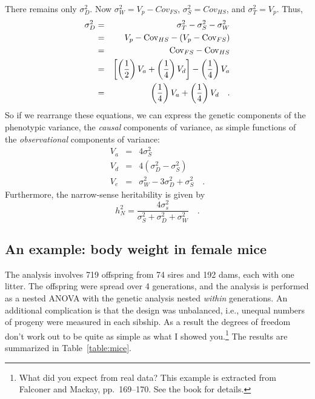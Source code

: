 There remains only $\sigma^2_D$.  Now $\sigma^2_W = V_p - Cov_{FS}$,
$\sigma^2_S = Cov_{HS}$, and $\sigma^2_T = V_p$.  Thus,
\begin{eqnarray*}
\sigma^2_D &=& \sigma^2_T - \sigma^2_S - \sigma^2_W \\
           &=& V_p - \mbox{Cov}_{HS} - (V_p - \mbox{Cov}_{FS}) \\
           &=& \mbox{Cov}_{FS} - \mbox{Cov}_{HS} \\
           &=& \left[
              \left(\frac{1}{2}\right)V_a + \left(\frac{1}{4}\right)V_d
              \right]
              - \left(\frac{1}{4}\right)V_a \\
           &=& \left(\frac{1}{4}\right)V_a +
           \left(\frac{1}{4}\right)V_d \quad .
\end{eqnarray*}
So if we rearrange these equations, we can express the genetic
components of the phenotypic variance, the {\it causal\/} components
of variance, as simple functions of the {\it observational} components
of variance:
\begin{eqnarray*}
V_a &=& 4\sigma^2_S \\
V_d &=& 4(\sigma^2_D - \sigma^2_S) \\
V_e &=& \sigma^2_W - 3\sigma^2_D + \sigma^2_S \quad .
\end{eqnarray*}
Furthermore, the narrow-sense heritability is given by
\[
h^2_N = \frac{4\sigma^2_s}{\sigma^2_S + \sigma^2_D + \sigma^2_W} \quad .
\]

\subsection*{An example: body weight in female mice}

The analysis involves 719 offspring from 74 sires and 192 dams, each
with one litter.  The offspring were spread over 4 generations, and
the analysis is performed as a nested ANOVA with the genetic analysis
nested {\it within\/} generations.  An additional complication is that
the design was unbalanced, i.e., unequal numbers of progeny were
measured in each sibship.  As a result the degrees of freedom don't
work out to be quite as simple as what I showed you.\footnote{What did
you expect from real data? This example is extracted from Falconer and
Mackay, pp.\ 169--170. See the book for details.} The results are
summarized in Table~\ref{table:mice}.

